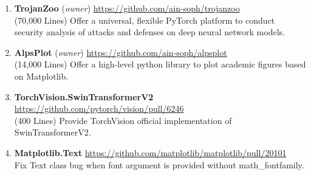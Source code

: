 \documentclass[letterpaper,11pt]{article}
\newcommand{\sociallink}[3]{\mbox{{#1}\hspace{0.5em}\href{#2}{#3}\hspace{1em}}}
\newcommand*{\website}[1]{\sociallink{\faGithub}{#1}{#1}}
\begin{document}
\begin{enumerate}[labelsep=15pt, parsep=4pt]

    \item \textbf{TrojanZoo} (\textit{owner}) \hfill \website{https://github.com/ain-soph/trojanzoo}
    \vspace{0.3em}\\
    (70,000 Lines) Offer a universal, flexible PyTorch platform to conduct security analysis of attacks and defenses on deep neural network models.

    \item \textbf{AlpsPlot} (\textit{owner}) \hfill \website{https://github.com/ain-soph/alpsplot}
    \vspace{0.3em}\\
    (14,000 Lines) Offer a high-level python library to plot academic figures based on Matplotlib.
    
    \item \textbf{TorchVision.SwinTransformerV2} \hfill
    \website{https://github.com/pytorch/vision/pull/6246}
    \vspace{0.3em}\\
    (400 Lines) Provide TorchVision official implementation of SwinTransformerV2.


    \item \textbf{Matplotlib.Text} \hfill
    \website{https://github.com/matplotlib/matplotlib/pull/20101}
    \vspace{0.3em}\\
    Fix Text class bug when font argument is provided without math\_fontfamily.


\end{enumerate}

\end{document}
